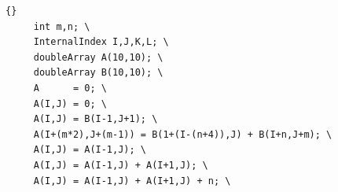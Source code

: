 \documentclass[10pt]{article}
\newcommand{\commentout}[1]{}
\begin{document}
\begin{lstlisting}{}
     int m,n; \
     InternalIndex I,J,K,L; \
     doubleArray A(10,10); \
     doubleArray B(10,10); \
     A      = 0; \
     A(I,J) = 0; \
     A(I,J) = B(I-1,J+1); \
     A(I+(m*2),J+(m-1)) = B(1+(I-(n+4)),J) + B(I+n,J+m); \
     A(I,J) = A(I-1,J); \
     A(I,J) = A(I-1,J) + A(I+1,J); \
     A(I,J) = A(I-1,J) + A(I+1,J) + n; \

\end{lstlisting}


\commentout{
\subsubsection{Multiple Statement Transformation Example (no transformation assertions)}

   The following code demonstrates the transformations of multiple statements.  The code
representing the transformation specification is divided into supporting declarations and
initializations.  The declarations are collected at the top of the scope while the variable
initializations required to support the transformation are positioned between the transformation
source code (loop nests).

}
\end{document}
